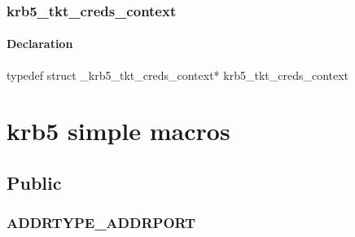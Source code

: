 \documentclass[letterpaper,10pt,english]{sphinxmanual}
\begin{document}
\subsubsection{krb5\_tkt\_creds\_context}
\label{appdev/refs/types/krb5_tkt_creds_context::doc}\label{appdev/refs/types/krb5_tkt_creds_context:krb5-tkt-creds-context}\label{appdev/refs/types/krb5_tkt_creds_context:krb5-tkt-creds-context-struct}

\begin{fulllineitems}
\label{appdev/refs/types/krb5_tkt_creds_context:krb5_tkt_creds_context}
\end{fulllineitems}



\paragraph{Declaration}
\label{appdev/refs/types/krb5_tkt_creds_context:declaration}
typedef struct \_krb5\_tkt\_creds\_context* krb5\_tkt\_creds\_context


\section{krb5 simple macros}
\label{appdev/refs/macros/index:krb5-simple-macros}\label{appdev/refs/macros/index::doc}

\subsection{Public}
\label{appdev/refs/macros/index:public}

\subsubsection{ADDRTYPE\_ADDRPORT}
\label{appdev/refs/macros/ADDRTYPE_ADDRPORT:addrtype-addrport-data}\label{appdev/refs/macros/ADDRTYPE_ADDRPORT::doc}\label{appdev/refs/macros/ADDRTYPE_ADDRPORT:addrtype-addrport}

\begin{fulllineitems}
\label{appdev/refs/macros/ADDRTYPE_ADDRPORT:ADDRTYPE_ADDRPORT}
\end{fulllineitems}


\begin{tabulary}{\linewidth}{|L|L|}
\hline

 & 
\\\hline
\end{tabulary}
\end{document}

